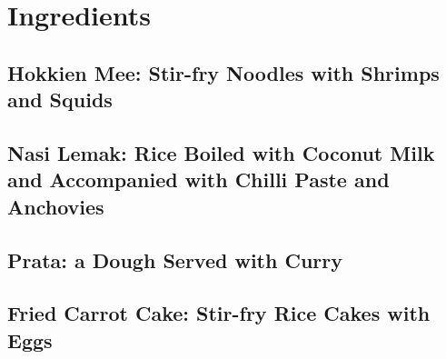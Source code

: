 \chapter{Ingredients}
\label{append:ingred}

\section{Hokkien Mee: Stir-fry Noodles with Shrimps and Squids}

\lipsum[51]

\section{Nasi Lemak: Rice Boiled with Coconut Milk and Accompanied with Chilli Paste and Anchovies}

\lipsum[52]

\section{Prata: a Dough Served with Curry}

\lipsum[53]

\section{Fried Carrot Cake: Stir-fry Rice Cakes with Eggs}

\lipsum[54]
